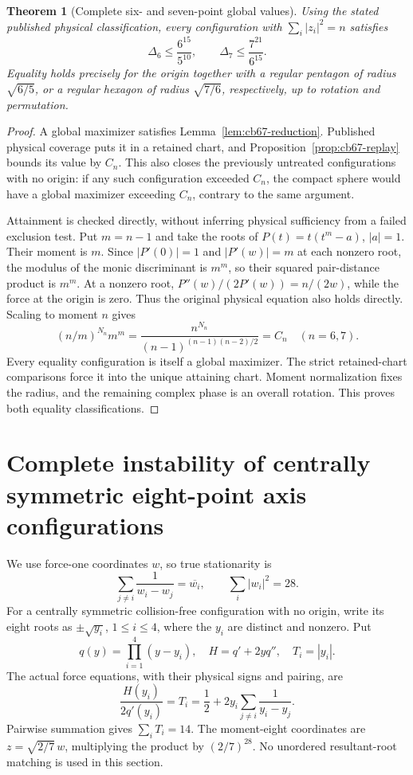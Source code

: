\documentclass[11pt,a4paper]{article}
\newtheorem{theorem}{Theorem}[section]
\theoremstyle{remark}
\begin{document}
\begin{theorem}[Complete six- and seven-point global values]
\label{thm:cb67-global}
Using the stated published physical classification, every configuration
with $\sum_i|z_i|^2=n$ satisfies
\[
 \Delta_6\le\frac{6^{15}}{5^{10}},\qquad
 \Delta_7\le\frac{7^{21}}{6^{15}}.
\]
Equality holds precisely for the origin together with a regular pentagon
of radius $\sqrt{6/5}$, or a regular hexagon of radius $\sqrt{7/6}$,
respectively, up to rotation and permutation.
\end{theorem}
\begin{proof}
A global maximizer satisfies Lemma~\ref{lem:cb67-reduction}.
Published physical coverage puts it in a retained chart, and
Proposition~\ref{prop:cb67-replay} bounds its value by $C_n$.
This also closes the previously untreated configurations with no origin:
if any such configuration exceeded $C_n$, the compact sphere would have
a global maximizer exceeding $C_n$, contrary to the same argument.

Attainment is checked directly, without inferring physical sufficiency
from a failed exclusion test. Put $m=n-1$ and take the roots of
$P(t)=t(t^m-a)$, $|a|=1$. Their moment is $m$.
Since $|P'(0)|=1$ and $|P'(w)|=m$ at each nonzero root,
the modulus of the monic discriminant is $m^m$, so their squared
pair-distance product is $m^m$.
At a nonzero root, $P''(w)/(2P'(w))=n/(2w)$, while the force at the origin
is zero. Thus the original physical equation also holds directly.
Scaling to moment $n$ gives
\[
 (n/m)^{N_n}m^m
 =\frac{n^{N_n}}{(n-1)^{(n-1)(n-2)/2}}=C_n\quad(n=6,7).
\]
Every equality configuration is itself a global maximizer. The strict
retained-chart comparisons force it into the unique attaining chart.
Moment normalization fixes the radius, and the remaining complex phase
is an overall rotation. This proves both equality classifications.
\end{proof}

\section{Complete instability of centrally symmetric eight-point axis configurations}
\label{sec:eight-even-new-axes}

We use force-one coordinates $w$, so true stationarity is
\[
 \sum_{j\ne i}\frac1{w_i-w_j}=\overline{w_i},\qquad
 \sum_i|w_i|^2=28.
\]
For a centrally symmetric collision-free configuration with no origin,
write its eight roots as $\pm\sqrt{y_i}$, $1\le i\le4$, where
the $y_i$ are distinct and nonzero. Put
\[
 q(y)=\prod_{i=1}^4(y-y_i),\quad H=q'+2yq'',\quad T_i=|y_i|.
\]
The actual force equations, with their physical signs and pairing, are
\begin{equation}\label{eq:eight-even-new-physical}
 \frac{H(y_i)}{2q'(y_i)}=T_i
 =\frac12+2y_i\sum_{j\ne i}\frac1{y_i-y_j}.
\end{equation}
Pairwise summation gives $\sum_iT_i=14$. The moment-eight coordinates
are $z=\sqrt{2/7}\,w$, multiplying the product by $(2/7)^{28}$.
No unordered resultant-root matching is used in this section.
\end{document}
